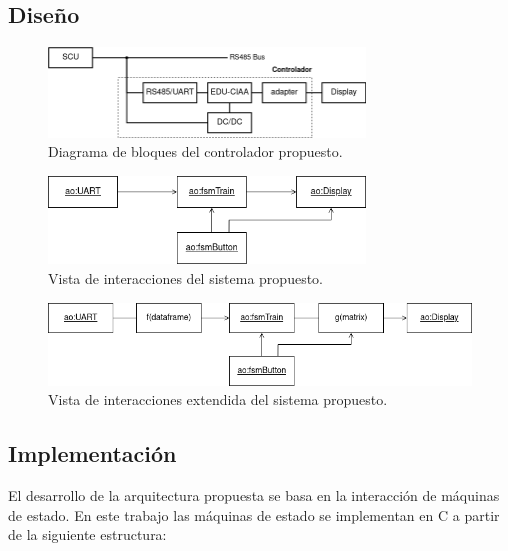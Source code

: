 \pagebreak
\subsection{Diseño}


\begin{figure}[ht]
	\centering
	\includegraphics[width=0.75\textwidth]{./Figures/diagVistaReDisenhoEduCIAA.png}
	\caption{Diagrama de bloques del controlador propuesto.}
	\label{fig:diagVistaReDisenhoEduCIAA}
\end{figure}


\begin{figure}[ht]
	\centering
	\includegraphics[width=0.75\textwidth]{./Figures/diagVistaDisenho.png}
	\caption{Vista de interacciones del sistema propuesto.}
	\label{fig:diagVistaDisenho}
\end{figure}

\begin{figure}[ht]
	\centering
	\includegraphics[width=1\textwidth]{./Figures/diagVistaDisenhoExtendida.png}
	\caption{Vista de interacciones extendida del sistema propuesto.}
	\label{fig:diagVistaDisenhoExtendida}
\end{figure}

\pagebreak
\subsection{Implementación}

El desarrollo de la arquitectura propuesta se basa en la interacción de máquinas de estado.
En este trabajo las máquinas de estado se implementan en C a partir de la siguiente estructura:

